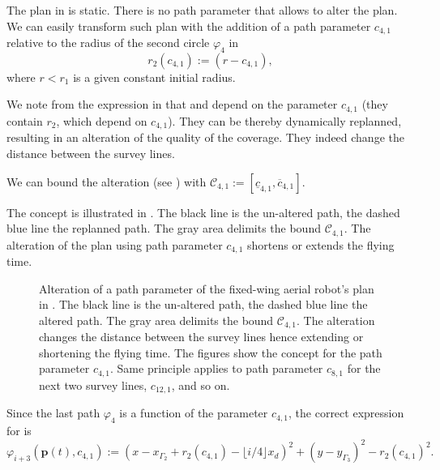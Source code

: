 The plan in  is static. There is no path parameter that allows to alter the plan. We can easily transform such plan with the addition of a path parameter $c_{4,1}$ relative to the radius of the second circle $\varphi_4$ in 
\begin{equation}\label{eq:radius-dynamic}
  r_2(c_{4,1}):=(r-c_{4,1}),
\end{equation}
where $r<r_1$ is a given constant initial radius.

We note from the expression in  that  and  depend on the parameter $c_{4,1}$ (they contain $r_2$, which depend on $c_{4,1}$). They can be thereby dynamically replanned, resulting in an alteration of the quality of the coverage. They indeed change the distance between the survey lines.

We can bound the alteration (see ) with $\mathcal{C}_{4,1}:=[\underline{c}_{4,1},\overline{c}_{4,1}]$. 

The concept is illustrated in . The black line is the un-altered path, the dashed blue line the replanned path. The gray area delimits the bound $\mathcal{C}_{4,1}$. The alteration of the plan using path parameter $c_{4,1}$ shortens or extends the flying time.

\begin{figure}[p!]
  \centering
  
  \caption[Alteration of a path parameter of the fixed-wing aerial robot's plan]{Alteration of a path parameter of the fixed-wing aerial robot's plan in . The black line is the un-altered path, the dashed blue line the altered path. The gray area delimits the bound $\mathcal{C}_{4,1}$. The alteration changes the distance between the survey lines hence extending or shortening the flying time. The figures show the concept for the path parameter $c_{4,1}$. Same principle applies to path parameter $c_{8,1}$ for the next two survey lines, $c_{12,1}$, and so on.}
  \label{fig:plot5}
\end{figure}

Since the last path $\varphi_4$ is a function of the parameter $c_{4,1}$, the correct expression for  is 
\begin{equation}
  \varphi_{i+3}(\mathbf{p}(t),c_{4,1}):=(x-x_{\Gamma_2}+r_2(c_{4,1})-\lfloor i/4\rfloor x_d)^2+(y-y_{\Gamma_3})^2-r_2(c_{4,1})^2.
\end{equation}

